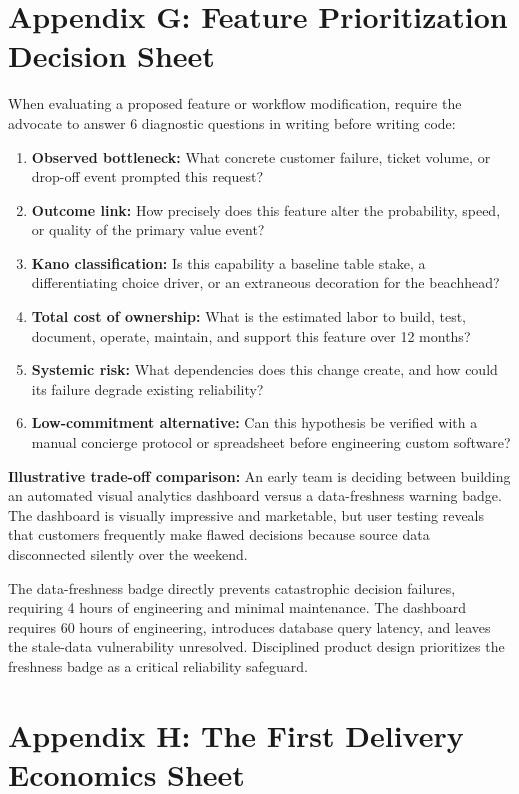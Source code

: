 \section*{Appendix G: Feature Prioritization Decision Sheet}

When evaluating a proposed feature or workflow modification, require the advocate to answer 6 diagnostic questions in writing before writing code:

\begin{enumerate}[leftmargin=*]
\item \textbf{Observed bottleneck:} What concrete customer failure, ticket volume, or drop-off event prompted this request?
\item \textbf{Outcome link:} How precisely does this feature alter the probability, speed, or quality of the primary value event?
\item \textbf{Kano classification:} Is this capability a baseline table stake, a differentiating choice driver, or an extraneous decoration for the beachhead?
\item \textbf{Total cost of ownership:} What is the estimated labor to build, test, document, operate, maintain, and support this feature over 12 months?
\item \textbf{Systemic risk:} What dependencies does this change create, and how could its failure degrade existing reliability?
\item \textbf{Low-commitment alternative:} Can this hypothesis be verified with a manual concierge protocol or spreadsheet before engineering custom software?
\end{enumerate}

\textbf{Illustrative trade-off comparison:} An early team is deciding between building an automated visual analytics dashboard versus a data-freshness warning badge. The dashboard is visually impressive and marketable, but user testing reveals that customers frequently make flawed decisions because source data disconnected silently over the weekend. 

The data-freshness badge directly prevents catastrophic decision failures, requiring 4 hours of engineering and minimal maintenance. The dashboard requires 60 hours of engineering, introduces database query latency, and leaves the stale-data vulnerability unresolved. Disciplined product design prioritizes the freshness badge as a critical reliability safeguard.

\section*{Appendix H: The First Delivery Economics Sheet}

